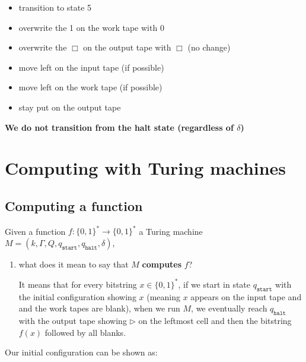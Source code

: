 \documentclass{article}
\newcommand{\qs}{q_{\texttt{start}}}
\newcommand{\qh}{q_{\texttt{halt}}}
\begin{document}
\begin{itemize}
  \item transition to state 5
  \item overwrite the 1 on the work tape with 0
  \item overwrite the $\Box$ on the output tape with $\Box$ (no change)
  \item move left on the input tape (if possible)
  \item move left on the work tape (if possible)
        \item stay put on the output tape
\end{itemize}

\textbf{We do not transition from the halt state (regardless of $\delta$)}

\section{Computing with Turing machines}

\subsection{Computing a function}

Given a function $f : \{ 0,1 \} ^{*} \rightarrow \{ 0,1 \} ^{* }$ a Turing machine $M = (k, \Gamma, Q, q_{\texttt{start}}, q_{\texttt{halt} }, \delta)$,

\begin{enumerate}
  \item what does it mean to say that $M$ \textbf{computes} $f$?

        It means that for every bitstring $x \in \{ 0,1 \}^{*}$, if we start in state $\qs$ with the initial configuration showing $x$ (meaning $x$ appears on the input tape and and the work tapes are blank), when we run $M$, we eventually reach $\qh$ with the output tape showing $\rhd$ on the leftmost cell and then the bitstring $f(x)$ followed by all blanks.
\end{enumerate}

Our initial configuration can be shown as:
\end{document}
